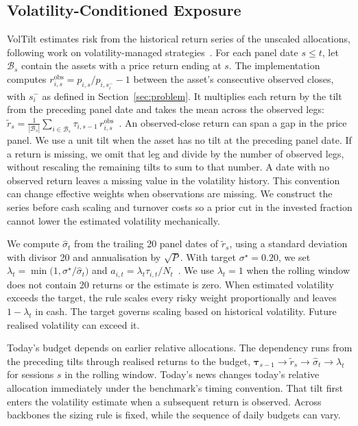 \subsection{Volatility-Conditioned Exposure}

VolTilt estimates risk from the historical return series of the unscaled allocations, following work on volatility-managed strategies~\cite{barroso2015moments,moreira2017volmanaged}. For each panel date $s\le t$, let $\mathcal{B}_s$ contain the assets with a price return ending at $s$. The implementation computes $r^{\mathrm{obs}}_{i,s}=p_{i,s}/p_{i,s_i^-}-1$ between the asset's consecutive observed closes, with $s_i^-$ as defined in Section~\ref{sec:problem}. It multiplies each return by the tilt from the preceding panel date and takes the mean across the observed legs:
$\tilde r_s=\frac{1}{|\mathcal{B}_s|}\sum_{i\in\mathcal{B}_s}\tau_{i,s-1}\,r^{\mathrm{obs}}_{i,s}$~.
An observed-close return can span a gap in the price panel. We use a unit tilt when the asset has no tilt at the preceding panel date. If a return is missing, we omit that leg and divide by the number of observed legs, without rescaling the remaining tilts to sum to that number. A date with no observed return leaves a missing value in the volatility history. This convention can change effective weights when observations are missing. We construct the series before cash scaling and turnover costs so a prior cut in the invested fraction cannot lower the estimated volatility mechanically.

We compute $\hat\sigma_t$ from the trailing 20 panel dates of $\tilde r_s$, using a standard deviation with divisor 20 and annualisation by $\sqrt P$. With target $\sigma^\star=0.20$, we set
$\lambda_t=\min\bigl(1,\sigma^\star/\hat\sigma_t\bigr)$ and $a_{i,t}=\lambda_t\tau_{i,t}/N_t$~.
We use $\lambda_t=1$ when the rolling window does not contain 20 returns or the estimate is zero. When estimated volatility exceeds the target, the rule scales every risky weight proportionally and leaves $1-\lambda_t$ in cash. The target governs scaling based on historical volatility. Future realised volatility can exceed it.

Today's budget depends on earlier relative allocations. The dependency runs from the preceding tilts through realised returns to the budget, $\boldsymbol{\tau}_{s-1}\to\tilde r_s\to\hat\sigma_t\to\lambda_t$ for sessions $s$ in the rolling window. Today's news changes today's relative allocation immediately under the benchmark's timing convention. That tilt first enters the volatility estimate when a subsequent return is observed. Across backbones the sizing rule is fixed, while the sequence of daily budgets can vary.

